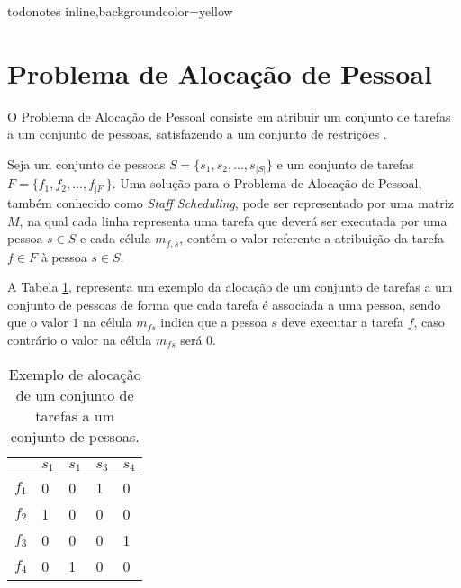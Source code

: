 
\presetkeys%
    {todonotes}%
    {inline,backgroundcolor=yellow}{}


\section{Problema de Alocação de Pessoal}

O Problema de Alocação de Pessoal consiste em atribuir um conjunto de tarefas a um conjunto de pessoas, satisfazendo a um conjunto de restrições \cite{blochiger:2003}.


Seja um conjunto de pessoas $S = \{s_1,s_ 2, ..., s_{|S|}\}$ e um conjunto de tarefas  $F = \{f_1, f_2, ..., f_{|F|}\}$. Uma solução para o Problema de Alocação de Pessoal, também conhecido como \textit{Staff Scheduling}, pode ser representado por uma matriz $M$, na qual cada linha representa uma tarefa que deverá ser executada por uma pessoa $s \in S$ e cada célula $m_{f,s}$, contém o valor referente a atribuição da tarefa $f \in F$ à pessoa $s \in S$.

A Tabela \ref{time_table_block}, representa um exemplo da alocação de um conjunto de tarefas a um conjunto de pessoas de forma que cada tarefa é associada a uma pessoa, sendo que o valor $1$ na célula $m_{fs}$ indica que a pessoa $s$ deve executar a tarefa $f$, caso contrário o valor na célula $m_{fs}$ será 0.

\begin{table}[h]
\centering
\caption{Exemplo de alocação de um conjunto de tarefas a um conjunto de pessoas. \label{time_table_block}} 
\begin{tabular}{r|l|l|l|l}
   & $s_1$ & $s_1$ & $s_3$ & $s_4$ \\ \hline
$f_1$ & 0  & 0  & 1  & 0  \\ \hline
$f_2$ & 1  & 0  & 0  & 0  \\ \hline
$f_3$ & 0  & 0  & 0  & 1  \\ \hline
$f_4$ & 0  & 1  & 0  & 0 
\end{tabular}
\end{table}

